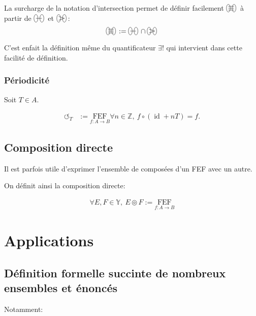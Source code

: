 \documentclass{article}
\newcommand{\Y}{{\mathbb Y}}
\newcommand{\FEF}[1]{\underset{f:A\to B}{\text{FEF}}#1}
\newcommand{\Z}{{\mathbb Z}}
\newcommand{\id}{\operatorname{id}}
\newcommand{\periodicfunctions}{\circlearrowleft}
\newcommand{\bijections}{%
	\begin{tikzpicture}[scale=1.25, baseline=-0.75ex]%
		\draw (-0.75ex,0) ellipse (0.5ex and 1ex);
		\draw (0.75ex,0) ellipse (0.5ex and 1ex);
		\draw (-0.75ex,0.5ex) -- (0.75ex,0.5ex);
		\draw (-0.75ex,0) -- (0.75ex,0);
		\draw (-0.75ex,-0.5ex) -- (0.75ex,-0.5ex);
	\end{tikzpicture}\,%
}
\newcommand{\injections}{%
	\begin{tikzpicture}[scale=1.25, baseline=-0.75ex]%
		\draw (-0.75ex,0) ellipse (0.5ex and 1ex);
		\draw (0.75ex,0) ellipse (0.5ex and 1ex);
		\draw (-0.75ex,0) -- (0.75ex,0);
	\end{tikzpicture}\,%
}
\newcommand{\surjections}{%
	\begin{tikzpicture}[scale=1.25, baseline=-0.75ex]%
		\draw (-0.75ex,0) ellipse (0.5ex and 1ex);
		\draw (0.75ex,0) ellipse (0.5ex and 1ex);
		\draw (-0.75ex,0.5ex) -- (0.75ex,0);
		\draw (-0.75ex,-0.5ex) -- (0.75ex,0);
	\end{tikzpicture}\,%
}
\begin{document}
\label{def_FEF_bijections}
La surcharge de la notation d'intersection permet de définir facilement $\bijections$ à partir de $\injections$ et $\surjections$: 
\[
	\bijections := \injections \cap \surjections
\] 

C'est enfait la définition même du quantificateur $\exists!$ qui intervient dans cette facilité de définition.

\subsubsection{Périodicité}
Soit $T \in A$.

\begin{align*}
	\periodicfunctions_T &:= \FEF{\forall n \in \Z,\ f \circ (\id + nT) = f}
.\end{align*}

\subsection{Composition directe}

Il est parfois utile d'exprimer l'ensemble de composées d'un FEF avec un autre.

On définit ainsi la composition directe:

\begin{align*}
	\forall E, F \in \Y,\ E \circledcirc F := \FEF{}
\end{align*}

\section{Applications}

\subsection{Définition formelle succinte de nombreux ensembles et énoncés}

Notamment:
\end{document}
